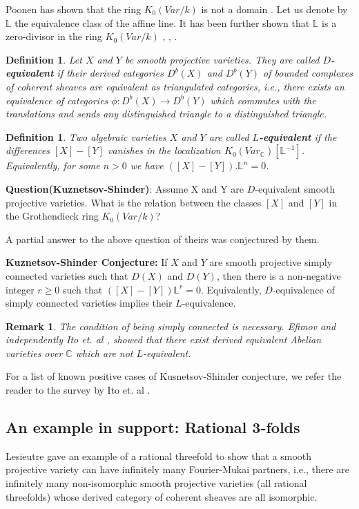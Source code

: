 \documentclass[a4, 11pt]{amsart}
\newtheorem{definition}[theorem]{\sf Definition}
\newtheorem{remark}[theorem]{\sf Remark}
\def\C{\mathbb C}
\def \L{\mathbb L}
\def \ra{\rightarrow}
\def \ra{\rightarrow}
\begin{document}
Poonen has shown that the ring $K_0(Var/k)$ is not a domain \cite{Ponnen}. Let us denote by $\mathbb{L}$ the equivalence class of the affine line. It has been further shown that $\mathbb{L}$ is a zero-divisor in the ring $K_0(Var/k)$ \cite{Lzero}, \cite{Lzero2}, \cite{Lzero3}. 

\begin{definition}
 Let $X$ and $Y$ be smooth projective varieties. They are called \textbf{$D$-equivalent} if their derived categories $D^b(X)$ and $D^b(Y)$ of bounded complexes of coherent sheaves are equivalent as triangulated categories, i.e., there exists an equivalence of categories $\phi : D^b(X) \ra D^b(Y)$ which commutes with the translations and sends any distinguished triangle to a distinguished triangle. 
\end{definition}

\begin{definition}
    Two algebraic varieties $X$ and $Y$ are called \textbf{$L$-equivalent} if the differences $[X]-[Y]$ vanishes in the localization $K_0(Var_{\C})[\L^{-1}]$. Equivalently, for some $n >0$ we have $([X]-[Y]).\L^n =0$. 
\end{definition}

\textbf{Question(Kuznetsov-Shinder)}: Assume X and Y are $D$-equivalent smooth projective varieties. What is the relation between the classes $[X]$  and $[Y]$ in the Grothendieck ring $K_0(Var/k)$? 

A partial answer to the above question of theirs was conjectured by them. 

\textbf{Kuznetsov-Shinder Conjecture:} If $X$ and $Y$ are smooth projective simply connected varieties such that $D(X)$ and $D(Y)$, then there is a non-negative integer $r \geq 0$ such that $([X]-[Y])\mathbb{L}^r = 0$. Equivalently, $D$-equivalence of simply connected varieties implies their $L$-equivalence. 

\begin{remark}
   The condition of being simply connected is necessary. Efimov \cite{Efimov} and independently Ito et. al \cite{Ito}, showed that there exist derived equivalent Abelian varieties over $\C$ which are not $L$-equivalent.  
\end{remark}

For a list of known positive cases of Kusnetsov-Shinder conjecture, we refer the reader to the survey by Ito et. al \cite{Ito}. 


\subsection{An example in support: Rational 3-folds}
Lesieutre \cite{Lesi} gave an example of a rational threefold to show that a smooth projective variety can have infinitely many Fourier-Mukai partners, i.e., there are infinitely many non-isomorphic smooth projective varieties (all rational threefolds) whose derived category of coherent sheaves are all isomorphic. 
\end{document}
